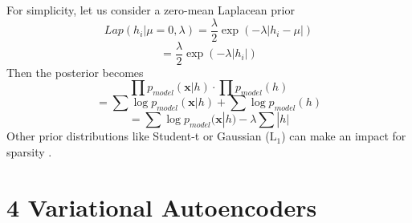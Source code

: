 \documentclass[11pt,twocolumn]{article}
\begin{document}
For simplicity, let us consider a zero-mean Laplacean prior \cite{Goodfellow-et-al-2016}
\begin{equation} 
Lap(h_i|\mu=0,\lambda) = \frac{\lambda}{2}\exp(-\lambda|h_i - \mu|)
\end{equation}
\begin{equation} 
 = \frac{\lambda}{2}\exp(-\lambda|h_i |)
\end{equation}
Then the posterior becomes
\begin{equation} 
\prod p_{model}(\mathbf{x}|h) \cdot \prod  p_{model}(h)
\end{equation}
\begin{equation} 
= \sum \log p_{model}(\mathbf{x}|h) + \sum \log  p_{model}(h)
\end{equation}
\begin{equation}
 = \sum \log p_{model}(\mathbf{x}|h) - \lambda \sum |h|
\end{equation}
Other prior distributions like Student-t or Gaussian ($\text{L}_1$)  can make an impact for sparsity \cite{Goodfellow-et-al-2016}.
\section{4 Variational Autoencoders}
\end{document}
